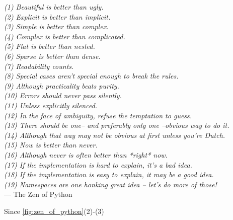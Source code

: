\begin{flushright}{\slshape    
(1) Beautiful is better than ugly. \\ \label{cit:line_a}
(2) Explicit is better than implicit. \\ \label{cit:line_b}
(3) Simple is better than complex. \\
(4) Complex is better than complicated. \\
(5) Flat is better than nested. \\
(6) Sparse is better than dense. \\
(7) Readability counts. \\
(8) Special cases aren't special enough to break the rules. \\
(9) Although practicality beats purity. \\
(10) Errors should never pass silently. \\
(11) Unless explicitly silenced. \\
(12) In the face of ambiguity, refuse the temptation to guess. \\
(13) There should be one-- and preferably only one --obvious way to do it. \\
(14) Although that way may not be obvious at first unless you're Dutch. \\
(15) Now is better than never. \\
(16) Although never is often better than *right* now. \\
(17) If the implementation is hard to explain, it's a bad idea. \\
(18) If the implementation is easy to explain, it may be a good idea. \\
(19) Namespaces are one honking great idea -- let's do more of those! } \\ \medskip
--- The Zen of Python
\end{flushright}
\label{fig:zen_of_python}



Since \cref{fig:zen_of_python}(2)-(3)


